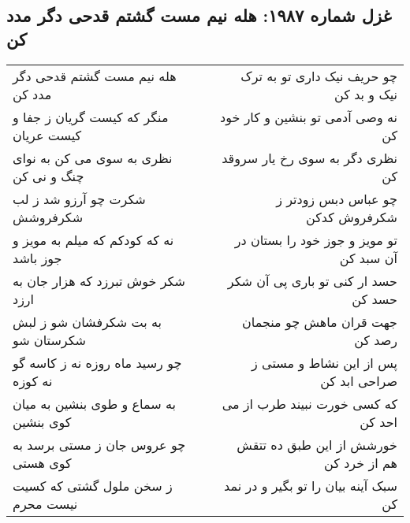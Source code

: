 \begin{center}
\section*{غزل شماره ۱۹۸۷: هله نیم مست گشتم قدحی دگر مدد کن}
\label{sec:1987}
\begin{longtable}{l p{0.5cm} r}
هله نیم مست گشتم قدحی دگر مدد کن
&&
چو حریف نیک داری تو به ترک نیک و بد کن
\\
منگر که کیست گریان ز جفا و کیست عریان
&&
نه وصی آدمی تو بنشین و کار خود کن
\\
نظری به سوی می کن به نوای چنگ و نی کن
&&
نظری دگر به سوی رخ یار سروقد کن
\\
شکرت چو آرزو شد ز لب شکرفروشش
&&
چو عباس دبس زودتر ز شکرفروش کدکن
\\
نه که کودکم که میلم به مویز و جوز باشد
&&
تو مویز و جوز خود را بستان در آن سبد کن
\\
شکر خوش تبرزد که هزار جان به ارزد
&&
حسد ار کنی تو باری پی آن شکر حسد کن
\\
به بت شکرفشان شو ز لبش شکرستان شو
&&
جهت قران ماهش چو منجمان رصد کن
\\
چو رسید ماه روزه نه ز کاسه گو نه کوزه
&&
پس از این نشاط و مستی ز صراحی ابد کن
\\
به سماع و طوی بنشین به میان کوی بنشین
&&
که کسی خورت نبیند طرب از می احد کن
\\
چو عروس جان ز مستی برسد به کوی هستی
&&
خورشش از این طبق ده تتقش هم از خرد کن
\\
ز سخن ملول گشتی که کسیت نیست محرم
&&
سبک آینه بیان را تو بگیر و در نمد کن
\\
\end{longtable}
\end{center}
